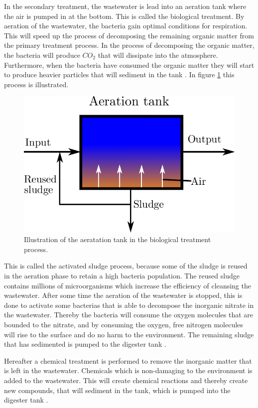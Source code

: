 In the secondary treatment, the wastewater is lead into an aeration tank where the air is pumped in at the bottom. This is called the biological treatment. By aeration of the wastewater, the bacteria gain optimal conditions for respiration. This will speed up the process of decomposing the remaining organic matter from the primary treatment process. In the process of decomposing the organic matter, the bacteria will produce $CO_2$ that will dissipate into the atmosphere. Furthermore, when the bacteria have consumed the organic matter they will start to produce heavier particles that will sediment in the tank \cite{wwtp_ekstra}. In figure \ref{fig:secondary_treatment} this process is illustrated.



\begin{figure}[H]
\centering
\includegraphics[width=.5\textwidth]{report/introduction/pictures/aeration_tank.pdf}
\caption{Illustration of the aeratation tank in the biological treatment process.}
\label{fig:secondary_treatment}%
\end{figure} 
This is called the activated sludge process, because some of the sludge is reused in the aeration phase to retain a high bacteria population. %
The reused sludge contains millions of microorganisms which increase the efficiency of cleansing the wastewater. After some time the aeration of the wastewater is stopped, this is done to activate some bacterias that is able to decompose the inorganic nitrate in the wastewater. Thereby the bacteria will consume the oxygen molecules that are bounded to the nitrate, and by consuming the oxygen, free nitrogen molecules will rise to the surface and do no harm to the environment. The remaining sludge that has sedimented is pumped to the digester tank \cite{epa_wwtp}. 

Hereafter a chemical treatment is performed to remove the inorganic matter that is left in the wastewater. Chemicals which is non-damaging to the environment is added to the wastewater.
This will create chemical reactions and thereby create new compounds, that will sediment in the tank, which is pumped into the digester tank \cite{youtube_wastewater}.  

